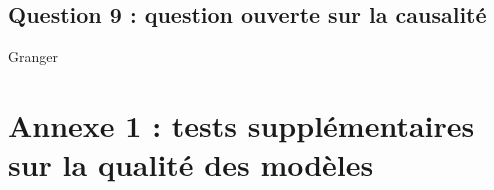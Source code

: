 \documentclass[]{article}
\begin{document}
\hypertarget{question-9-question-ouverte-sur-la-causalituxe9}{%
\subsection{Question 9 : question ouverte sur la causalité}\label{question-9-question-ouverte-sur-la-causalituxe9}}

Granger

\hypertarget{appendix-appendix}{%
\appendix}


\hypertarget{sec:qualRes}{%
\section{Annexe 1 : tests supplémentaires sur la qualité des modèles}\label{sec:qualRes}}

\begin{table}[!h]


\end{table}
\end{document}
